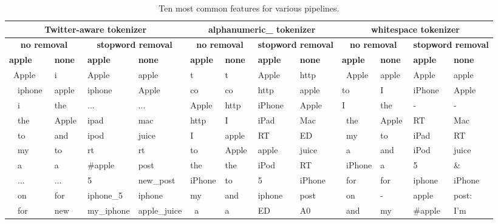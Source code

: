 \documentclass[letterpaper]{article}
\begin{document}
\begin{table}[ht]
\centering
\begin{tabular}{|l|l|l|l|l|l|l|l|l|l|l|l|}
\hline
\multicolumn{4}{|c|}{\textbf{Twitter-aware tokenizer}} & \multicolumn{4}{|c|}{\textbf{alphanumeric\_ tokenizer}} & \multicolumn{4}{|c|}{\textbf{whitespace tokenizer}} \\
\hline
\multicolumn{2}{|c|}{\textbf{no removal}} & \multicolumn{2}{|c|}{\textbf{stopword removal}} &\multicolumn{2}{|c|}{\textbf{no removal}} & \multicolumn{2}{|c|}{\textbf{stopword removal}} &\multicolumn{2}{|c|}{\textbf{no removal}} & \multicolumn{2}{|c|}{\textbf{stopword removal}}\\
\hline
\textbf{apple} & \textbf{none} & \textbf{apple} & \textbf{none} & \textbf{apple} & \textbf{none} & \textbf{apple} & \textbf{none} & \textbf{apple} & \textbf{none} & \textbf{apple} & \textbf{none} \\ \hline
  Apple  & i     & Apple      & apple        & t        & t     & Apple  & http   & Apple  & apple & Apple   & apple  \\
  iphone & apple & iphone     & Apple        & co       & co    & http   & apple  & to     & I     & iPhone  & Apple  \\
  i      & the   & ...        & ...          & Apple    & http  & iPhone & Apple  & I      & the   & -       & -      \\
  the    & Apple & ipad       & mac          & http     & I     & iPad   & Mac    & the    & Apple & RT      & Mac    \\
  to     & and   & ipod       & juice        & I        & apple & RT     & ED     & my     & to    & iPad    & RT     \\ 
  my     & to    & rt         & rt           & to       & Apple & apple  & juice  & a      & and   & iPod    & juice  \\
  a      & a     & \#apple    & post         & the      & the   & iPod   & RT     & iPhone & a     & 5       & \&     \\
  ...    & ...   & 5          & new\_post    & iPhone   & to    & 5      & iPhone & for    & for   & iphone  & iPhone \\
  on     & for   & iphone\_5  & iphone       & my       & and   & iphone & post   & on     & -     & apple   & post:  \\
  for    & new   & my\_iphone & apple\_juice & a        & a     & ED     & A0     & and    & my    & \#apple & I'm    \\ \hline

\end{tabular}
\caption{Ten most common features for various pipelines.}
\label{tab:features}
\end{table}
\end{document}
